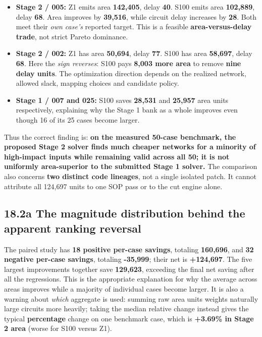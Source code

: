\begin{itemize}
\tightlist
\item
  \textbf{Stage 2 / 005:} Z1 emits area \textbf{142,405}, delay \textbf{40}. S100 emits area \textbf{102,889}, delay \textbf{68}. Area improves by \textbf{39,516}, while circuit delay increases by \textbf{28}. Both meet their \emph{own case's} reported target. This is a feasible \textbf{area-versus-delay trade}, not strict Pareto dominance.
\item
  \textbf{Stage 2 / 002:} Z1 has area \textbf{50,694}, delay \textbf{77}. S100 has area \textbf{58,697}, delay \textbf{68}. Here the \emph{sign reverses}: S100 pays \textbf{8,003 more area} to remove \textbf{nine delay units}. The optimization direction depends on the realized network, allowed slack, mapping choices and candidate policy.
\item
  \textbf{Stage 1 / 007 and 025:} S100 saves \textbf{28,531} and \textbf{25,957} area units respectively, explaining why the Stage 1 bank as a whole improves even though 16 of its 25 cases become larger.
\end{itemize}

Thus the correct finding is: \textbf{on the measured 50-case benchmark, the proposed Stage 2 solver finds much cheaper networks for a minority of high-impact inputs while remaining valid across all 50; it is not uniformly area-superior to the submitted Stage 1 solver.} The comparison also concerns \textbf{two distinct code lineages}, not a single isolated patch. It cannot attribute all 124,697 units to one SOP pass or to the cut engine alone.

\subsection{18.2a The magnitude distribution behind the apparent ranking reversal}\label{a-the-magnitude-distribution-behind-the-apparent-ranking-reversal}

The paired study has \textbf{18 positive per-case savings}, totaling \textbf{160,696}, and \textbf{32 negative per-case savings}, totaling \textbf{-35,999}; their net is \textbf{+124,697}. The five largest improvements together save \textbf{129,623}, exceeding the final net saving after all the regressions. This is the appropriate explanation for why the average across areas improves while a majority of individual cases become larger. It is also a warning about \emph{which} aggregate is used: summing raw area units weights naturally large circuits more heavily; taking the median relative change instead gives the typical \textbf{percentage} change on one benchmark case, which is \textbf{+3.69\% in Stage 2 area} (worse for S100 versus Z1).

